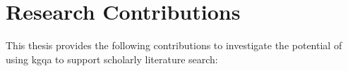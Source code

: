 



\section{Research Contributions}

This thesis provides the following contributions to investigate the potential of using \gls{kgqa} to support scholarly literature search:

